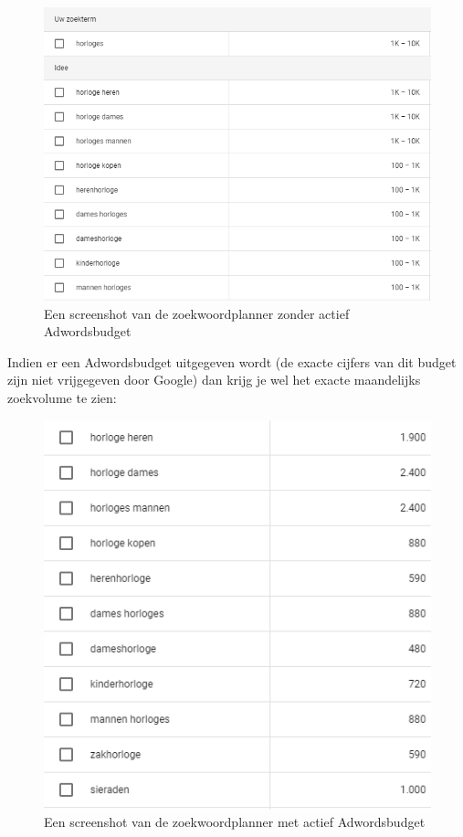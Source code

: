 \begin{figure}[h!]
\centering
\includegraphics[width=\linewidth]{Bachelorproef/bachelor/img/Zoekwoordplannergratis.PNG}
\caption{Een screenshot van de zoekwoordplanner zonder actief Adwordsbudget \autocite{google.be}}
\end{figure}

Indien er een Adwordsbudget uitgegeven wordt (de exacte cijfers van dit budget zijn niet vrijgegeven door Google) dan krijg je wel het exacte maandelijks zoekvolume te zien: 

\begin{figure}[h!]
\centering
\includegraphics[width=\linewidth]{Bachelorproef/bachelor/img/Zoekwoordplannerbet.PNG}
\caption{Een screenshot van de zoekwoordplanner met actief Adwordsbudget \autocite{google.be}}
\end{figure}

